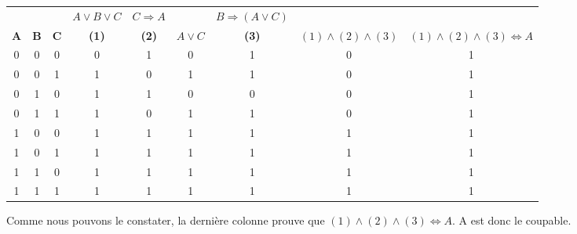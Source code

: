 \documentclass{report}
\begin{document}
\begin{center}
\begin{tabular}{ccccccccc}
 &  &  & $A \vee B \vee C$ & $C \Rightarrow A$ &  & $B \Rightarrow (A \vee C)$ &  & \\
\textbf{\textcolor{tcA}{$\textbf{A}$}} & \textbf{\textcolor{tcA}{$\textbf{B}$}} & \textbf{\textcolor{tcA}{$\textbf{C}$}} & \textbf{\textcolor{tcA}{(1)}} & \textbf{\textcolor{tcA}{(2)}} & \textbf{\textcolor{tcA}{$A \vee C$}} & \textbf{\textcolor{tcA}{(3)}} & \textbf{\textcolor{tcA}{$(1)\wedge(2)\wedge(3)$}} & \textbf{\textcolor{tcA}{$(1)\wedge(2)\wedge(3) \Leftrightarrow A $}}\\
0 & 0 & 0 & 0 & 1 & 0 & 1 & 0 & 1\\
0 & 0 & 1 & 1 & 0 & 1 & 1 & 0 & 1\\
0 & 1 & 0 & 1 & 1 & 0 & 0 & 0 & 1\\
0 & 1 & 1 & 1 & 0 & 1 & 1 & 0 & 1\\
1 & 0 & 0 & 1 & 1 & 1 & 1 & 1 & 1\\
1 & 0 & 1 & 1 & 1 & 1 & 1 & 1 & 1\\
1 & 1 & 0 & 1 & 1 & 1 & 1 & 1 & 1\\
1 & 1 & 1 & 1 & 1 & 1 & 1 & 1 & 1
\end{tabular}
\end{center}

  
Comme nous pouvons le constater, la derni\`{e}re colonne prouve que $(1)\wedge(2)\wedge(3) \Leftrightarrow A $. A est donc le coupable.
 
 
 
 
 
 
 
 
 
\end{document}

